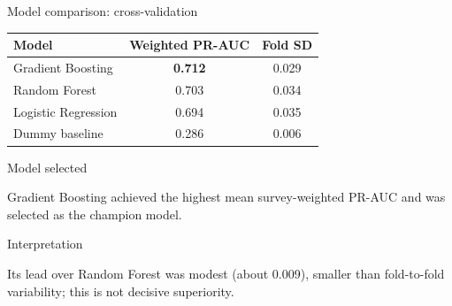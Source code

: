\documentclass[aspectratio=169,10pt]{beamer}
\begin{document}

\begin{frame}{Model comparison: cross-validation}

\small

\begin{table}

\centering

\begin{tabular}{lcc}

\toprule

\textbf{Model}
&
\textbf{Weighted PR-AUC}
&
\textbf{Fold SD}
\\

\midrule

Gradient Boosting
&
\textbf{0.712}
&
0.029
\\

Random Forest
&
0.703
&
0.034
\\

Logistic Regression
&
0.694
&
0.035
\\

Dummy baseline
&
0.286
&
0.006
\\

\bottomrule

\end{tabular}

\end{table}

\begin{block}{Model selected}

Gradient Boosting achieved the highest mean survey-weighted PR-AUC and was selected as the champion model.

\end{block}

\begin{alertblock}{Interpretation}

Its lead over Random Forest was modest (about 0.009), smaller than fold-to-fold variability; this is not decisive superiority.

\end{alertblock}

\end{frame}

\end{document}
